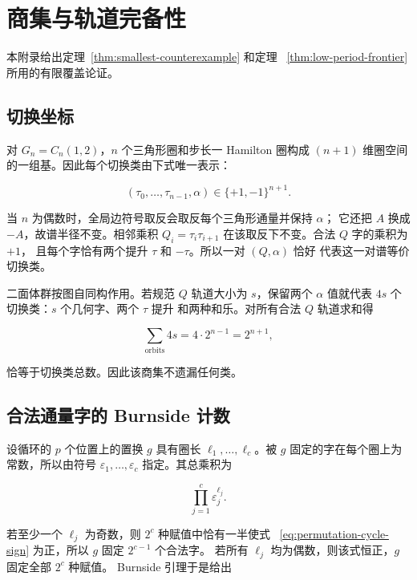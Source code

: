 \section{商集与轨道完备性}\label{app:orbit-completeness}

本附录给出定理~\ref{thm:smallest-counterexample} 和定理~
\ref{thm:low-period-frontier} 所用的有限覆盖论证。

\subsection{切换坐标}

对 \(G_n=C_n(1,2)\)，\(n\) 个三角形圈和步长一 Hamilton 圈构成
\((n+1)\) 维圈空间的一组基。因此每个切换类由下式唯一表示：

\begin{equation}
\label{eq:cycle-coordinate-space}
(\tau_{0},\ldots,\tau_{n-1},\alpha) \in \{+1,-1\}^{n+1}.
\end{equation}

当 \(n\) 为偶数时，全局边符号取反会取反每个三角形通量并保持 \(\alpha\)；
它还把 \(A\) 换成 \(-A\)，故谱半径不变。相邻乘积
\(Q_i=\tau_i\tau_{i+1}\) 在该取反下不变。合法 \(Q\) 字的乘积为 \(+1\)，
且每个字恰有两个提升 \(\tau\) 和 \(-\tau\)。所以一对 \((Q,\alpha)\) 恰好
代表这一对谱等价切换类。

二面体群按图自同构作用。若规范 \(Q\) 轨道大小为 \(s\)，保留两个
\(\alpha\) 值就代表 \(4s\) 个切换类：\(s\) 个几何字、两个 \(\tau\) 提升
和两种和乐。对所有合法 \(Q\) 轨道求和得

\begin{equation}
\label{eq:orbit-weight-identity}
\sum_{\mathrm{orbits}} 4s = 4\cdot 2^{n-1}=2^{n+1},
\end{equation}

恰等于切换类总数。因此该商集不遗漏任何类。

\subsection{合法通量字的 Burnside 计数}

设循环的 \(p\) 个位置上的置换 \(g\) 具有圈长
\(\ell_1,\ldots,\ell_c\)。被 \(g\) 固定的字在每个圈上为常数，所以由符号
\(\varepsilon_1,\ldots,\varepsilon_c\) 指定。其总乘积为

\begin{equation}
\label{eq:permutation-cycle-sign}
\prod_{j=1}^c \varepsilon_j^{\ell_j}.
\end{equation}

若至少一个 \(\ell_j\) 为奇数，则 \(2^c\) 种赋值中恰有一半使式~
\eqref{eq:permutation-cycle-sign} 为正，所以 \(g\) 固定 \(2^{c-1}\) 个合法字。
若所有 \(\ell_j\) 均为偶数，则该式恒正，\(g\) 固定全部 \(2^c\) 种赋值。
Burnside 引理于是给出

